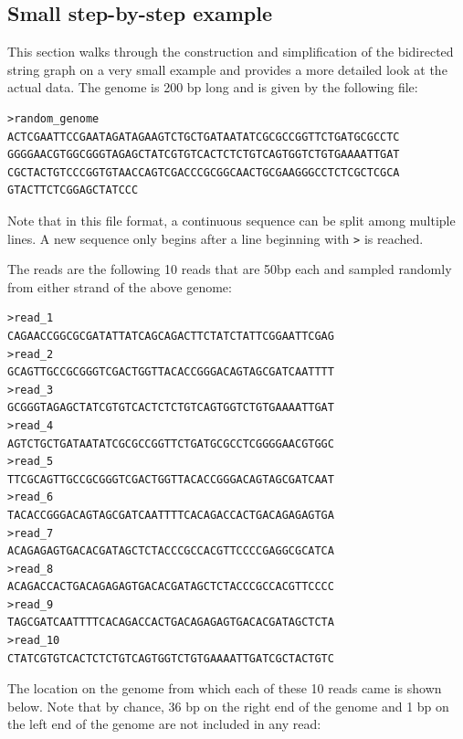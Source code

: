 \documentclass[10pt]{article}
\begin{document}
\subsection{Small step-by-step example}

This section walks through the construction and simplification of the bidirected
string graph on a very small example and provides a more detailed look at the
actual data.  The genome is 200 bp long and is given by the following file:


\begin{verbatim}
>random_genome
ACTCGAATTCCGAATAGATAGAAGTCTGCTGATAATATCGCGCCGGTTCTGATGCGCCTC
GGGGAACGTGGCGGGTAGAGCTATCGTGTCACTCTCTGTCAGTGGTCTGTGAAAATTGAT
CGCTACTGTCCCGGTGTAACCAGTCGACCCGCGGCAACTGCGAAGGGCCTCTCGCTCGCA
GTACTTCTCGGAGCTATCCC
\end{verbatim}

Note that in this file format, a continuous sequence can be split among multiple
lines.  A new sequence only begins after a line beginning with {\tt >} is
reached.

The reads are the following 10 reads that are 50bp each and sampled randomly
from either strand of the above genome:

\begin{verbatim}
>read_1
CAGAACCGGCGCGATATTATCAGCAGACTTCTATCTATTCGGAATTCGAG
>read_2
GCAGTTGCCGCGGGTCGACTGGTTACACCGGGACAGTAGCGATCAATTTT
>read_3
GCGGGTAGAGCTATCGTGTCACTCTCTGTCAGTGGTCTGTGAAAATTGAT
>read_4
AGTCTGCTGATAATATCGCGCCGGTTCTGATGCGCCTCGGGGAACGTGGC
>read_5
TTCGCAGTTGCCGCGGGTCGACTGGTTACACCGGGACAGTAGCGATCAAT
>read_6
TACACCGGGACAGTAGCGATCAATTTTCACAGACCACTGACAGAGAGTGA
>read_7
ACAGAGAGTGACACGATAGCTCTACCCGCCACGTTCCCCGAGGCGCATCA
>read_8
ACAGACCACTGACAGAGAGTGACACGATAGCTCTACCCGCCACGTTCCCC
>read_9
TAGCGATCAATTTTCACAGACCACTGACAGAGAGTGACACGATAGCTCTA
>read_10
CTATCGTGTCACTCTCTGTCAGTGGTCTGTGAAAATTGATCGCTACTGTC
\end{verbatim}

The location on the genome from which each of these 10 reads came is shown
below.  Note that by chance, 36 bp on the right end of the genome and 1 bp on
the left end of the genome are not included in any read:

\end{document}
